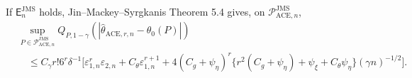 If \(\mathsf E_n^{\mathrm{JMS}}\) holds, Jin--Mackey--Syrgkanis Theorem 5.4 gives, on \(\mathcal P_{\mathrm{ACE},n}^{\mathrm{JMS}}\),
\[
 \begin{aligned}
 &\sup_{P\in\mathcal P_{\mathrm{ACE},n}^{\mathrm{JMS}}}
 Q_{P,1-\gamma}(|\widehat\theta_{\mathrm{ACE},r,n}-\theta_0(P)|)\\
 &\quad\le C_{\gamma}r!6^r\delta^{-1}
 \Big[\varepsilon_{1,n}^r\varepsilon_{2,n}
 +C_{\theta}\varepsilon_{1,n}^{r+1}
 +4(C_g+\psi_{\eta})^r
 \{r^2(C_g+\psi_{\eta})+\psi_{\xi}+C_{\theta}\psi_{\eta}\}
 (\gamma n)^{-1/2}\Big].
 \end{aligned}
\]